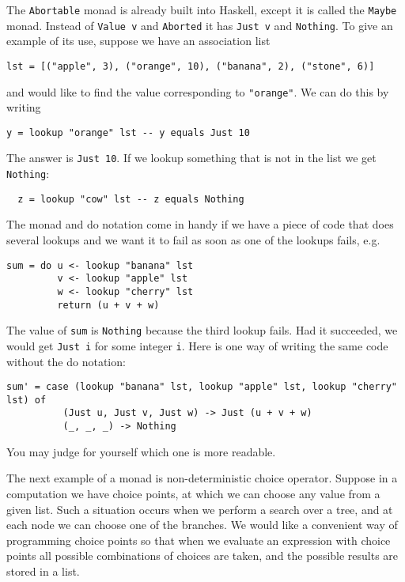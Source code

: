 \documentclass[a4paper,10pt]{article}
\newcommand{\cc}[1]{\lstinline{#1}}
\begin{document}
The \cc{Abortable} monad is already built into Haskell, except it is called the \cc{Maybe} monad. Instead of \cc{Value v} and \cc{Aborted} it has \cc{Just v} and \cc{Nothing}. To give an example of its use, suppose we have an association list
%
\begin{lstlisting}
lst = [("apple", 3), ("orange", 10), ("banana", 2), ("stone", 6)]
\end{lstlisting}
%
and would like to find the value corresponding to \cc{"orange"}. We can do this by writing
%
\begin{lstlisting}
y = lookup "orange" lst -- y equals Just 10
\end{lstlisting}
%
The answer is \cc{Just 10}. If we lookup something that is not in the list we get \cc{Nothing}:
%
\begin{lstlisting}
  z = lookup "cow" lst -- z equals Nothing
\end{lstlisting}
%
The monad and do notation come in handy if we have a piece of code that does several lookups and we want it to fail as soon as one of the lookups fails, e.g.
%
\begin{lstlisting}
sum = do u <- lookup "banana" lst
         v <- lookup "apple" lst
         w <- lookup "cherry" lst
         return (u + v + w)
\end{lstlisting}
%
The value of \cc{sum} is \cc{Nothing} because the third lookup fails. Had it succeeded, we would get \cc{Just i} for some integer \cc{i}. Here is one way of writing the same code without the do notation:
%
\begin{lstlisting}
sum' = case (lookup "banana" lst, lookup "apple" lst, lookup "cherry" lst) of
          (Just u, Just v, Just w) -> Just (u + v + w)
          (_, _, _) -> Nothing
\end{lstlisting}
%
You may judge for yourself which one is more readable.

The next example of a monad is non-deterministic choice operator. Suppose in a computation we have choice points, at which we can choose any value from a given list. Such a situation occurs when we perform a search over a tree, and at each node we can choose one of the branches. We would like a convenient way of programming choice points so that when we evaluate an expression with choice points all possible combinations of choices are taken, and the possible results are stored in a list.
\end{document}
